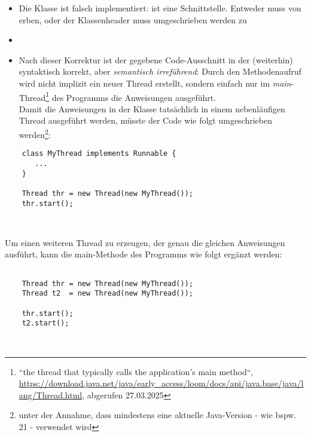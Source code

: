 \begin{itemize}
    \itemsep0.5em
    \item Die Klasse  ist falsch implementiert:  ist eine Schnittstelle.
    Entweder muss  von  erben, oder der Klassenheader muss umgeschrieben werden zu
    \item[] \begin{center}\end{center}
    \item Nach dieser Korrektur ist der gegebene Code-Ausschnitt in der  (weiterhin) syntaktisch korrekt, aber \textit{semantisch irreführend}: Durch den Methodenaufruf wird nicht implizit ein neuer Thread erstellt, sondern einfach nur im \textit{main}-Thread\footnote{
    ``the thread that typically calls the application's main method``, \url{https://download.java.net/java/early_access/loom/docs/api/java.base/java/lang/Thread.html}, abgerufen 27.03.2025
    } des Programms die Anweisungen ausgeführt.\\
    Damit die Anweisungen in  der Klasse  tatsächlich in einem nebenläufigen Thread ausgeführt werden, müsste der Code wie folgt umgeschrieben werden\footnote{unter der Annahme, dass mindestens eine aktuelle Java-Version - wie bspw. 21 - verwendet wird}:
\end{itemize}


\begin{verbatim}
    class MyThread implements Runnable {
       ...
    }

    Thread thr = new Thread(new MyThread());
    thr.start();
\end{verbatim}\\

\vspace{5mm}

\noindent
Um einen weiteren Thread zu erzeugen, der genau die gleichen Anweisungen ausführt, kann die main-Methode des Programms wie folgt ergänzt werden:

\begin{verbatim}

    Thread thr = new Thread(new MyThread());
    Thread t2  = new Thread(new MyThread());

    thr.start();
    t2.start();
\end{verbatim}\\